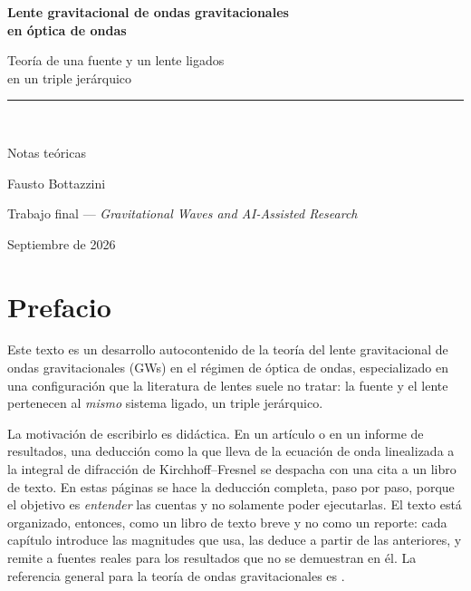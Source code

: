 \documentclass[11pt,a4paper,openany]{book}
\begin{document}
\begin{titlepage}
\thispagestyle{empty}
\centering
\vspace*{4.5cm}
{\LARGE\bfseries Lente gravitacional de ondas gravitacionales\\[0.35em]
en \'optica de ondas\par}
\vspace{0.9cm}
{\large Teor\'ia de una fuente y un lente ligados\\[0.2em]
en un triple jer\'arquico\par}
\vspace{2.2cm}
\rule{0.45\textwidth}{0.4pt}\\[0.9cm]
{\large Notas te\'oricas\par}
\vspace{1.4cm}
{\large Fausto Bottazzini\par}
\vspace{0.4cm}
{Trabajo final --- \emph{Gravitational Waves and AI-Assisted Research}\par}
\vspace{2.0cm}
{Septiembre de 2026\par}
\vfill
\end{titlepage}

\chapter*{Prefacio}

Este texto es un desarrollo autocontenido de la teor\'ia del lente
gravitacional de ondas gravitacionales (GWs) en el r\'egimen de \'optica de
ondas, especializado en una configuraci\'on que la literatura de lentes suele
no tratar: la fuente y el lente pertenecen al \emph{mismo} sistema ligado, un
triple jer\'arquico.

La motivaci\'on de escribirlo es did\'actica. En un art\'iculo o en un informe
de resultados, una deducci\'on como la que lleva de la ecuaci\'on de onda
linealizada a la integral de difracci\'on de Kirchhoff--Fresnel se despacha
con una cita a un libro de texto. En estas p\'aginas se hace la deducci\'on
completa, paso por paso, porque el objetivo es \emph{entender} las cuentas y no solamente
poder ejecutarlas. El texto est\'a organizado, entonces, como un libro de
texto breve y no como un reporte: cada cap\'itulo introduce las magnitudes
que usa, las deduce a partir de las anteriores, y remite a fuentes reales
para los resultados que no se demuestran en \'el. La referencia general
para la teor\'ia de ondas gravitacionales es \citet{Maggiore2008}.
\end{document}
